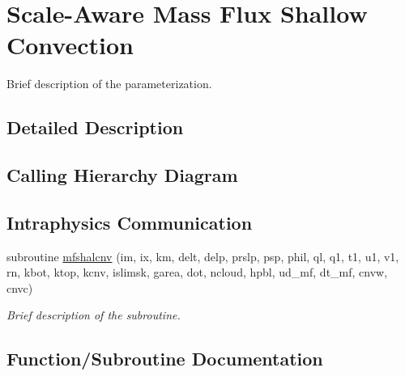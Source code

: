 \hypertarget{group___s_a_s_h_a_l}{}\section{Scale-\/\+Aware Mass Flux Shallow Convection}
\label{group___s_a_s_h_a_l}


Brief description of the parameterization.  




\subsection{Detailed Description}
\hypertarget{group___g_f_s___n_s_s_t_diagram}{}\subsection{Calling Hierarchy Diagram}\label{group___g_f_s___n_s_s_t_diagram}
\hypertarget{group___g_f_s___n_s_s_t_intraphysics}{}\subsection{Intraphysics Communication}\label{group___g_f_s___n_s_s_t_intraphysics}
\begin{DoxyCompactItemize}
\item 
subroutine \hyperlink{group___s_a_s_h_a_l_ga1daf095191e839740ef858e28d980e7b}{mfshalcnv} (im, ix, km, delt, delp, prslp, psp, phil, ql,                                           q1, t1, u1, v1, rn, kbot, ktop, kcnv, islimsk, garea,                                                                               dot, ncloud, hpbl, ud\+\_\+mf, dt\+\_\+mf, cnvw, cnvc)
\begin{DoxyCompactList}\small\item\em Brief description of the subroutine. \end{DoxyCompactList}\end{DoxyCompactItemize}


\subsection{Function/\+Subroutine Documentation}
\hypertarget{group___s_a_s_h_a_l_ga1daf095191e839740ef858e28d980e7b}{}
